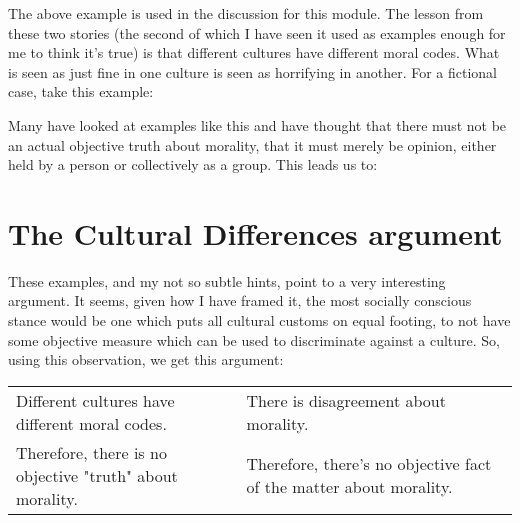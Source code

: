 The above example is used in the discussion for this module. The lesson from these two stories (the second of which I have seen it used as examples enough for me to think it's true) is that different cultures have different moral codes. What is seen as just fine in one culture is seen as horrifying in another. For a fictional case, take this example:


Many have looked at examples like this and have thought that there must not be an actual objective truth about morality, that it must merely be opinion, either held by a person or collectively as a group. This leads us to:
\section{The Cultural Differences argument}

These examples, and my not so subtle  hints, point to a very interesting argument. It seems, given how I have framed it, the most socially conscious stance would be one which puts all cultural customs on equal footing, to not have some objective measure which can be used to discriminate against a culture. So, using this observation, we get this argument:

\begin{tabular}{p{2in}|p{2in}}
    Different cultures have different moral codes.&There is disagreement about morality.\\
    Therefore, there is no objective "truth" about morality.&Therefore, there's no objective fact of the matter about morality.
\end{tabular}

